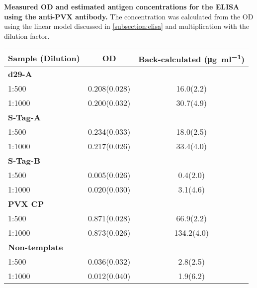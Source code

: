 \begin{supptable}[ht]
    \centering
    \caption{\textbf{Measured OD and estimated antigen concentrations for the ELISA using the anti-PVX antibody.} The concentration was calculated from the OD using the linear model discussed in \autoref{subsection:elisa} and multiplication with the dilution factor. }
    \label{tab:sample_values_elisa_anti_pvx}
    \begin{tabular}{
        l
        S[table-format=1.3(2),uncertainty-mode=separate]
        S[table-format=3.1(1),uncertainty-mode=separate]
    }
    \toprule
    {\textbf{Sample (Dilution)}} &
    {\textbf{OD}} &
    {\textbf{Back-calculated (\si{\micro\gram\per\milli\litre})}} \\
    \midrule
    \textbf{d29-A} \\
    1:500 & 0.208(0.028) & 16.0(2.2) \\
    1:1000 & 0.200(0.032) & 30.7(4.9) \\
    \textbf{S-Tag-A} \\
    1:500 & 0.234(0.033) & 18.0(2.5) \\
    1:1000 & 0.217(0.026) & 33.4(4.0) \\
    \textbf{S-Tag-B} \\
    1:500 & 0.005(0.026) & 0.4(2.0) \\
    1:1000 & 0.020(0.030) & 3.1(4.6) \\
    \textbf{PVX CP} \\
    1:500 & 0.871(0.028) & 66.9(2.2) \\
    1:1000 & 0.873(0.026) & 134.2(4.0) \\
    \textbf{Non-template} \\
    1:500 & 0.036(0.032) & 2.8(2.5) \\
    1:1000 & 0.012(0.040) & 1.9(6.2) \\
    \bottomrule
    \end{tabular}
\end{supptable}

